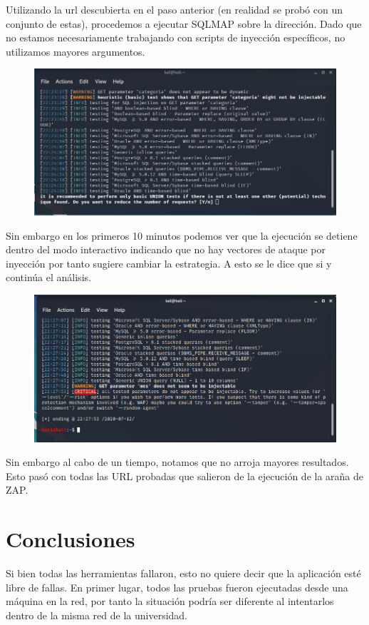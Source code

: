 \documentclass[11pt]{utalcaDoc}
\begin{document}
Utilizando la url descubierta en el paso anterior (en realidad se probó con un conjunto de estas), procedemos a ejecutar SQLMAP sobre la dirección. Dado que no estamos necesariamente trabajando con scripts de inyección específicos, no utilizamos mayores argumentos.

\begin{figure}[H]
	\centering
	\includegraphics[width=.75\textwidth]{images2/sqlmap2.png}
\end{figure}

Sin embargo en los primeros 10 minutos podemos ver que la ejecución se detiene dentro del modo interactivo indicando que no hay vectores de ataque por inyección por tanto sugiere cambiar la estrategia. A esto se le dice que si y continúa el análisis.

\begin{figure}[H]
	\centering
	\includegraphics[width=.75\textwidth]{images2/sqlmap3.png}
\end{figure}

Sin embargo al cabo de un tiempo, notamos que no arroja mayores resultados. Esto pasó con todas las URL probadas que salieron de la ejecución de la araña de ZAP.

\section{Conclusiones}
Si bien todas las herramientas fallaron, esto no quiere decir que la aplicación esté libre de fallas. En primer lugar, todos las pruebas fueron ejecutadas desde una máquina en la red, por tanto la situación podría ser diferente al intentarlos dentro de la misma red de la universidad. 
\end{document}
